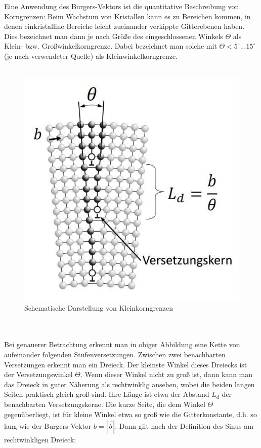 \documentclass[german,  %
parskip=full,  %
]{scrartcl}
\begin{document}
Eine Anwendung des Burgers-Vektors ist die quantitative Beschreibung von Korngrenzen: 
Beim Wachstum von Kristallen kann es zu Bereichen kommen, in denen einkristalline Bereiche leicht zueinander verkippte Gitterebenen haben. Dies bezeichnet man dann je nach Größe des eingeschlossenen Winkels $\Theta$ als Klein- bzw. Großwinkelkorngrenze. Dabei bezeichnet man solche mit $\Theta < 5^{\circ}...15^{\circ}$ (je nach verwendeter Quelle) als Kleinwinkelkorngrenze.
\\\\
\begin{figure}[h!]\centering
\includegraphics[scale=0.4]{Kleinwinkelkorngrenze.jpg}
\caption{Schematische Darstellung von Kleinkorngrenzen}
\end{figure}
\\\\
Bei genauerer Betrachtung erkennt man in obiger Abbildung eine Kette von aufeinander folgenden Stufenversetzungen. Zwischen zwei benachbarten Versetzungen erkennt man ein Dreieck. Der kleinste Winkel dieses Dreiecks ist der Versetzungswinkel \(\Theta\). Wenn dieser Winkel nicht zu groß ist, dann kann man das Dreieck in guter Näherung als rechtwinklig ansehen, wobei die beiden langen Seiten praktisch gleich groß sind. Ihre Länge ist etwa der Abstand \(L_{\mathrm{d}}\) der benachbarten Versetzungskerne. Die kurze Seite, die dem Winkel \(\Theta\) gegenüberliegt, ist für kleine Winkel etwa so groß wie die Gitterkonstante, d.h. so lang wie der Burgers-Vektor \(b=|\vec{b}|\). Dann gilt nach der Definition des Sinus am rechtwinkligen Dreieck:
\end{document}
